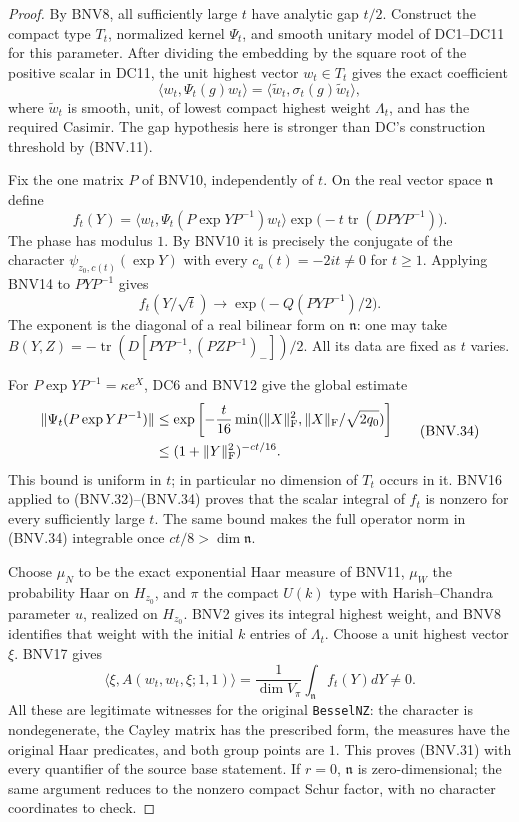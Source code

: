 \documentclass[11pt,a4paper]{article}
\numberwithin{equation}{section}
\theoremstyle{remark}\newtheorem{remark}[theorem]{Remark}
\begin{document}
\begin{proof}
By BNV8, all sufficiently large $t$ have analytic gap $t/2$.
Construct the compact type $T_t$, normalized kernel $\Psi_t$, and
smooth unitary model of DC1--DC11 for this parameter.  After dividing
the embedding by the square root of the positive scalar in DC11,
the unit highest vector $w_t\in T_t$ gives the exact coefficient
\[
 \langle w_t,\Psi_t(g)w_t\rangle
    =\langle\widetilde w_t,\sigma_t(g)\widetilde w_t\rangle,
\]
where $\widetilde w_t$ is smooth, unit, of lowest compact highest weight
$\Lambda_t$, and has the required Casimir.  The gap hypothesis here
is stronger than DC's construction threshold by (BNV.11).

Fix the one matrix $P$ of BNV10, independently of $t$.
On the real vector space $\mathfrak n$ define
\[
 f_t(Y)=\langle w_t,\Psi_t(P\exp YP^{-1})w_t\rangle
       \exp\bigl(-t\operatorname{tr}(DPYP^{-1})\bigr).
 \tag{BNV.32}
\]
The phase has modulus $1$.  By BNV10 it is precisely the conjugate
of the character $\psi_{z_0,c(t)}(\exp Y)$ with every
$c_a(t)=-2it\ne0$ for $t\ge1$.  Applying BNV14 to $PYP^{-1}$ gives
\[
 f_t(Y/\sqrt t)\longrightarrow
     \exp\bigl(-Q(PYP^{-1})/2\bigr).
 \tag{BNV.33}
\]
The exponent is the diagonal of a real bilinear form on $\mathfrak n$:
one may take
$B(Y,Z)=-\operatorname{tr}(D[PYP^{-1},(PZP^{-1})_-])/2$.
All its data are fixed as $t$ varies.

For $P\exp YP^{-1}=\kappa e^X$, DC6 and BNV12 give the global estimate
\[
 \begin{split}
 \|\Psi_t(P\exp YP^{-1})\|
 &\le\exp\left[-\frac{t}{16}
       \min(\|X\|_{\rm F}^2,\|X\|_{\rm F}/\sqrt{2q_0})\right]\\
 &\le(1+\|Y\|_{\rm F}^2)^{-ct/16}.
 \end{split}
 \tag{BNV.34}
\]
This bound is uniform in $t$; in particular no dimension of $T_t$
occurs in it.  BNV16 applied to (BNV.32)--(BNV.34) proves that the
scalar integral of $f_t$ is nonzero for every sufficiently large $t$.
The same bound makes the full operator norm in (BNV.34) integrable
once $ct/8>\dim\mathfrak n$.

Choose $\mu_N$ to be the exact exponential Haar measure of BNV11,
$\mu_W$ the probability Haar on $H_{z_0}$, and $\pi$ the compact
$U(k)$ type with Harish--Chandra parameter $u$, realized on $H_{z_0}$.
BNV2 gives its integral highest weight, and BNV8 identifies that
weight with the initial $k$ entries of $\Lambda_t$.
Choose a unit highest vector $\xi$.  BNV17 gives
\[
 \langle\xi,A(w_t,w_t,\xi;1,1)\rangle
       =\frac1{\dim V_\pi}\int_{\mathfrak n}f_t(Y)dY\ne0.
\]
All these are legitimate witnesses for the original \texttt{Bessel\allowbreak NZ}:
the character is nondegenerate, the Cayley matrix has the prescribed
form, the measures have the original Haar predicates, and both group
points are $1$.  This proves (BNV.31) with every quantifier of the
source base statement.  If $r=0$, $\mathfrak n$ is zero-dimensional;
the same argument reduces to the nonzero compact Schur factor, with
no character coordinates to check.
\end{proof}
\end{document}
